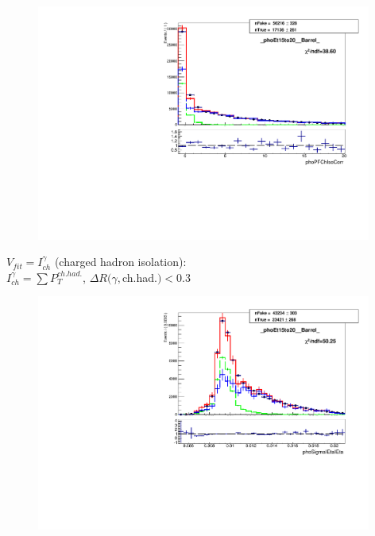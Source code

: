 \begin{frame}
\begin{minipage}[t]{0.49\textwidth}
  \begin{figure}[htb]
    \begin{center}
       \includegraphics[width=0.98\textwidth]{../figs/figs_v11/MUON_WGamma/TemplateFits/c_TEMPL_CHISO_UNblind__phoEt15to20__Barrel__RooFit.pdf}
    \end{center}
  \end{figure}
    \begin{center}
       \tiny
       $V_{fit}=I_{ch}^{\gamma}$ (charged hadron isolation):\\
       $I_{ch}^{\gamma} = \sum P_T^{ch.had.}$, $\Delta R(\gamma,$ch.had.$)<$0.3\\
    \end{center}
\end{minipage}%
\begin{minipage}[t]{0.49\textwidth}
  \begin{figure}[htb]
    \begin{center}
      \includegraphics[width=0.98\textwidth]{../figs/figs_v11/MUON_WGamma/TemplateFits/c_TEMPL_SIHIH_UNblind__phoEt15to20__Barrel__RooFit.pdf}

\end{center}
\end{figure}
\end{minipage}
\end{frame}
